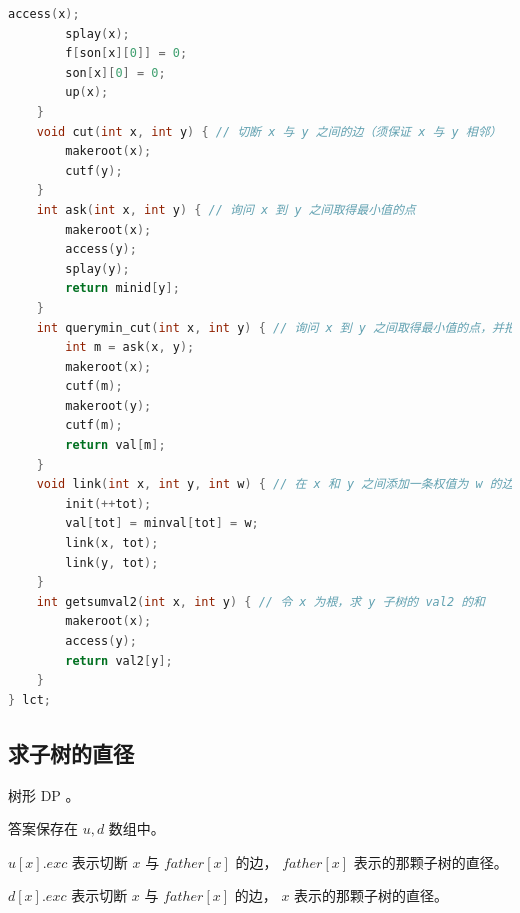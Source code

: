 \documentclass{article}
\begin{document}
\begin{lstlisting}[language=C++]
		access(x);
		splay(x);
		f[son[x][0]] = 0;
		son[x][0] = 0;
		up(x);
	}
	void cut(int x, int y) { // 切断 x 与 y 之间的边（须保证 x 与 y 相邻）
		makeroot(x);
		cutf(y);
	}
	int ask(int x, int y) { // 询问 x 到 y 之间取得最小值的点
		makeroot(x);
		access(y);
		splay(y);
		return minid[y];
	}
	int querymin_cut(int x, int y) { // 询问 x 到 y 之间取得最小值的点，并把它删去（须保证该点在 x 和 y 之间，且度数恰好为 2）
		int m = ask(x, y);
		makeroot(x);
		cutf(m);
		makeroot(y);
		cutf(m);
		return val[m];
	}
	void link(int x, int y, int w) { // 在 x 和 y 之间添加一条权值为 w 的边（将边视为点插入）
		init(++tot);
		val[tot] = minval[tot] = w;
		link(x, tot);
		link(y, tot);
	}
	int getsumval2(int x, int y) { // 令 x 为根，求 y 子树的 val2 的和
		makeroot(x);
		access(y);
		return val2[y];
	}
} lct;
\end{lstlisting}

\subsection{求子树的直径}

树形 DP 。

答案保存在 $u, d$ 数组中。

$u[x].exc$ 表示切断 $x$ 与 $father[x]$ 的边， $father[x]$ 表示的那颗子树的直径。

$d[x].exc$ 表示切断 $x$ 与 $father[x]$ 的边， $x$ 表示的那颗子树的直径。
\end{document}
